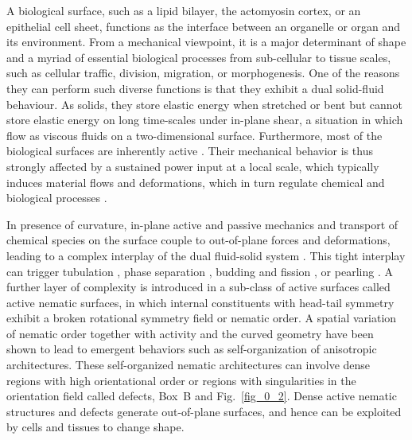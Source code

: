 A biological surface, such as a lipid bilayer, the actomyosin cortex, or an epithelial cell sheet, functions as the interface between an organelle or organ and its environment. From a mechanical viewpoint, it is a major determinant of shape and a myriad of essential biological processes from sub-cellular to tissue scales, such as cellular traffic, division, migration, or morphogenesis. One of the reasons they can perform such diverse functions is that they exhibit a dual solid-fluid behaviour. As solids, they store elastic energy when stretched or bent but cannot store elastic energy on long time-scales under in-plane shear, a situation in which  flow as viscous fluids on a two-dimensional surface. Furthermore, most of the biological surfaces are inherently active \cite{watson2015}. Their mechanical behavior is thus strongly affected by a sustained power input at a local scale, which typically induces material flows and deformations, which in turn regulate  chemical and biological processes \cite{bois2011}. 

In presence of curvature, in-plane active and passive mechanics and transport of chemical species on the surface couple to out-of-plane forces and deformations, leading to a complex interplay of the dual fluid-solid system \cite{arroyo2009, rahimi2013}. This tight interplay can trigger tubulation \cite{roux2002}, phase separation \cite{bacia2005}, budding
and fission \cite{staneva2004, zhou2005}, or pearling \cite{khalifat2014}. A further layer of complexity is introduced in a sub-class of active  surfaces called active nematic surfaces, in which internal constituents with head-tail symmetry exhibit a broken rotational symmetry field or nematic order. A spatial variation of nematic order together with activity and the curved geometry have been shown to lead to emergent behaviors such as self-organization of anisotropic architectures. These self-organized nematic architectures can involve dense regions with high orientational order or regions with singularities in the orientation field called defects, Box~B and Fig.~\ref{fig_0_2}. Dense active nematic structures and defects generate out-of-plane surfaces, and hence can be exploited by cells and tissues to change shape.


